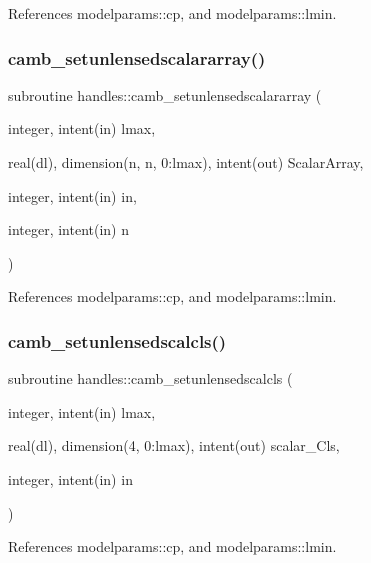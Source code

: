 References modelparams\+::cp, and modelparams\+::lmin.

\mbox{\label{namespacehandles_ad9c5c14a68ab016e4b976c1f3f665779}} 
\subsubsection{\texorpdfstring{camb\+\_\+setunlensedscalararray()}{camb\_setunlensedscalararray()}}
{\footnotesize\ttfamily subroutine handles\+::camb\+\_\+setunlensedscalararray (\begin{DoxyParamCaption}\item[{integer, intent(in)}]{lmax,  }\item[{real(dl), dimension(n, n, 0\+:lmax), intent(out)}]{Scalar\+Array,  }\item[{integer, intent(in)}]{in,  }\item[{integer, intent(in)}]{n }\end{DoxyParamCaption})}



References modelparams\+::cp, and modelparams\+::lmin.

\mbox{\label{namespacehandles_a8a98a8d5a48c920afe02832367244648}} 
\subsubsection{\texorpdfstring{camb\+\_\+setunlensedscalcls()}{camb\_setunlensedscalcls()}}
{\footnotesize\ttfamily subroutine handles\+::camb\+\_\+setunlensedscalcls (\begin{DoxyParamCaption}\item[{integer, intent(in)}]{lmax,  }\item[{real(dl), dimension(4, 0\+:lmax), intent(out)}]{scalar\+\_\+\+Cls,  }\item[{integer, intent(in)}]{in }\end{DoxyParamCaption})}



References modelparams\+::cp, and modelparams\+::lmin.

